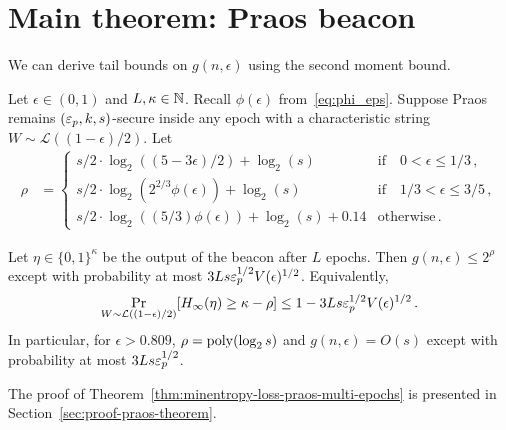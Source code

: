 \section{Main theorem: Praos beacon}



We can derive tail bounds on $g(n,\epsilon)$ using the second moment bound.

\begin{theorem}\label{thm:minentropy-loss-praos-multi-epochs}  
  Let $\epsilon \in (0, 1)$ and $L,\kappa \in \mathbb{N}$. 
  Recall $\phi(\epsilon)$ from~\eqref{eq:phi_eps}.
  Suppose Praos 
  remains $(\mathsf{\varepsilon}_p, k, s)$-secure 
  inside any epoch 
  with a characteristic string $W \sim \mathcal{L}((1-\epsilon)/2)$. 
  Let 
  \begin{align}
    \rho &= \begin{cases}
      s/2 \cdot \log_2\left( (5-3 \epsilon)/2 \right) + \log_2(s)  & \text{if}\quad 0 < \epsilon \leq 1/3\,, \\
      s/2 \cdot \log_2\left( 2^{2/3} \phi(\epsilon) \right) + \log_2(s) & \text{if}\quad 1/3 < \epsilon \leq 3/5\,, \\
      s/2 \cdot \log_2\left( (5/3) \phi(\epsilon) \right) + \log_2(s) + 0.14 & \text{otherwise}\,. 
    \end{cases}
    \label{eq:rho-praos-multiepoch}
  \end{align}

  Let $\eta \in \{0,1\}^\kappa$ be the output of the beacon after $L$ epochs.
  Then $g(n,\epsilon) \leq 2^\rho$ except with probability at most $3 L s \mathsf{\varepsilon}_p^{1/2} V(\epsilon)^{1/2}$.
  Equivalently,
  $$
    \Pr_{W \sim \mathcal{L}((1-\epsilon)/2)}[H_\infty(\eta) \geq \kappa - \rho] 
      \leq 1 - 3 L s \mathsf{\varepsilon}_p^{1/2} V(\epsilon)^{1/2} \,.
  $$
  In particular, for $\epsilon > 0.809$, 
  $\rho = \mathrm{poly}(\log_2 s)$ and $g(n,\epsilon) = O(s)$ 
  except with probability at most $3Ls \mathsf{\varepsilon}_p^{1/2}$.
\end{theorem}
\noindent
The proof of Theorem~\ref{thm:minentropy-loss-praos-multi-epochs} 
is presented in Section~\ref{sec:proof-praos-theorem}. 

